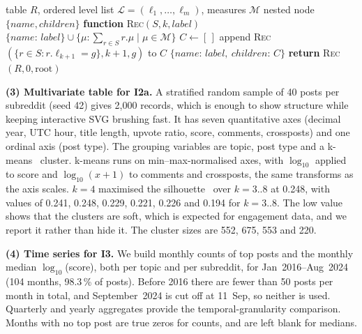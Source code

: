 \begin{algorithm}[!t]
\caption{Tabular-to-tree remodel (\texttt{to\_tree})}
\label{alg:tree}
\begin{algorithmic}[1]
\REQUIRE table $R$, ordered level list $\mathcal{L}=(\ell_1,\dots,\ell_m)$, measures $\mathcal{M}$
\ENSURE nested node $\{name, children\}$
\STATE \textbf{function} \textsc{Rec}$(S, k, label)$
  \RETURN $\{name{:}\,label\} \cup \{\mu{:}\sum_{r\in S} r.\mu \mid \mu\in\mathcal{M}\}$
\ENDIF
\STATE $C \leftarrow [\,]$
  \STATE append \textsc{Rec}$(\{r\in S : r.\ell_{k+1}=g\}, k+1, g)$ to $C$
\ENDFOR
\RETURN $\{name{:}\,label,\ children{:}\,C\}$
\STATE \textbf{return} \textsc{Rec}$(R, 0, \text{root})$
\end{algorithmic}
\end{algorithm}

\textbf{(3) Multivariate table for I2a.} A stratified random sample of 40 posts per subreddit (seed 42) gives 2,000
records, which is enough to show structure while keeping interactive SVG brushing fast. It has seven quantitative axes
(decimal year, UTC hour, title length, upvote ratio, score, comments, crossposts) and one ordinal axis (post type). The
grouping variables are topic, post type and a k-means~\cite{lloyd1982} cluster. k-means runs on min--max-normalised axes,
with $\log_{10}$ applied to score and $\log_{10}(x+1)$ to comments and crossposts, the same transforms as the axis
scales. $k=4$ maximised the silhouette~\cite{rousseeuw1987} over $k=3..8$ at 0.248, with values of 0.241, 0.248, 0.229,
0.221, 0.226 and 0.194 for $k=3..8$. The low value shows that the clusters are soft, which is expected for engagement data,
and we report it rather than hide it. The cluster sizes are 552, 675, 553 and 220.

\textbf{(4) Time series for I3.} We build monthly counts of top posts and the monthly median $\log_{10}$(score), both per
topic and per subreddit, for Jan~2016--Aug~2024 (104 months, 98.3\,\% of posts). Before 2016 there are fewer than 50 posts
per month in total, and September~2024 is cut off at 11~Sep, so neither is used. Quarterly and yearly aggregates provide
the temporal-granularity comparison. Months with no top post are true zeros for counts, and are left blank for medians.
